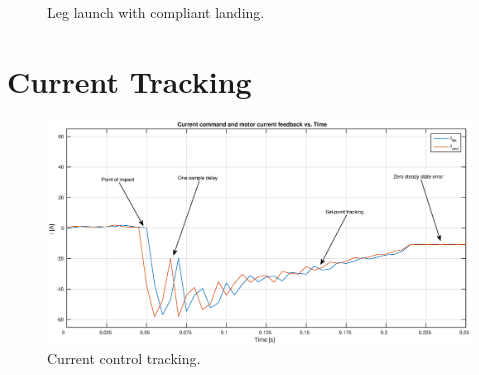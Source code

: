 \begin{figure}
\caption{Leg launch with compliant landing.}
\end{figure}

\section{Current Tracking}

\begin{figure}
\centering
\includegraphics[width=1\textwidth]{images/experiments/current-tracking-impact.eps} 
\caption{Current control tracking.}
\label{fig:Current control tracking}
\end{figure}
